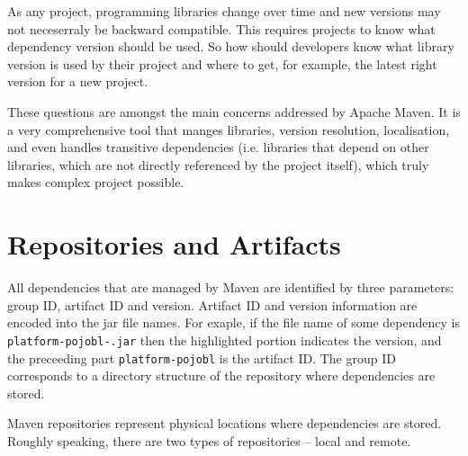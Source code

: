   As any project, programming libraries change over time and new versions may not neceserraly be backward compatible.
  This requires projects to know what dependency version should be used.
  So how should developers know what library version is used by their project and where to get, for example, the latest right version for a new project.

  These questions are amongst the main concerns addressed by Apache Maven.
  It is a very comprehensive tool that manges libraries, version resolution, localisation, and even handles transitive dependencies (i.e. libraries that depend on other libraries, which are not directly referenced by the project itself), which truly makes complex project possible.

  \section*{Repositories and Artifacts}
  All dependencies that are managed by Maven are identified by three parameters: group ID, artifact ID and version.
  Artifact ID and version information are encoded into the jar file names.
  For exaple, if the file name of some dependency is \texttt{platform-pojobl-.jar} then the highlighted portion \texttt{} indicates the version, and the preceeding part \texttt{platform-pojobl} is the artifact ID.
  The group ID corresponds to a directory structure of the repository where dependencies are stored.

  Maven repositories represent physical locations where dependencies are stored.
  Roughly speaking, there are two types of repositories -- local and remote.
  


